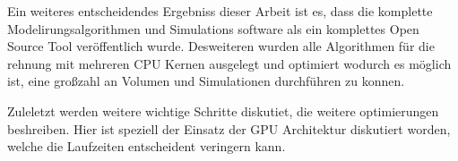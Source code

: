 Ein weiteres entscheidendes Ergebniss dieser Arbeit ist es, dass die komplette Modelirungsalgorithmen und Simulations software als ein komplettes Open Source Tool veröffentlich wurde.
Desweiteren wurden alle Algorithmen für die rehnung mit mehreren CPU Kernen ausgelegt und optimiert wodurch es möglich ist, eine großzahl an Volumen und Simulationen durchführen zu konnen.

Zuleletzt werden weitere wichtige Schritte diskutiet, die weitere optimierungen beshreiben.
Hier ist speziell der Einsatz der GPU Architektur diskutiert worden, welche die Laufzeiten entscheident veringern kann.